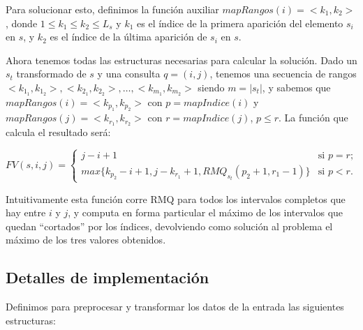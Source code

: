 Para solucionar esto, definimos la función auxiliar $mapRangos(i) = <k_1,k_2>$,
donde $1 \le k_1 \le k_2 \le L_s$ y $k_1$ es el índice de la primera aparición
del elemento $s_i$ en $s$, y $k_2$ es el índice de la última aparición de $s_i$ en $s$.

Ahora tenemos todas las estructuras necesarias para calcular la solución. Dado
un $s_t$ transformado de $s$ y una consulta $q = (i, j)$, tenemos una
secuencia de rangos $<k_{1_1}, k_{1_2}>, <k_{2_1}, k_{2_2}>, \ldots, <k_{m_1}, k_{m_2}>$
siendo $m = |s_t|$, y sabemos que $mapRangos(i) = <k_{p_1}, k_{p_2}>$ con
$p = mapIndice(i)$ y $mapRangos(j) = <k_{r_1}, k_{r_2}>$ con $r = mapIndice(j)$, $p \le r$.
La función que calcula el resultado será:

\[ FV(s, i, j) = \left\{ \begin{array}{ll}
                 j - i + 1 & \mbox{si $p = r$};\\
                 max\{ k_{p_2} - i + 1, j - k_{r_1} + 1, RMQ_{s_t}(p_2 + 1, r_1 - 1) \} & \mbox{si $p < r$}.\end{array} \right. \]
     
Intuitivamente esta función corre RMQ para todos los intervalos completos
que hay entre $i$ y $j$, y computa en forma particular el máximo de los
intervalos que quedan ``cortados'' por los índices, devolviendo como solución al
problema el máximo de los tres valores obtenidos.


\subsection*{Detalles de implementación}

Definimos para preprocesar y transformar los datos de la entrada las siguientes estructuras:

